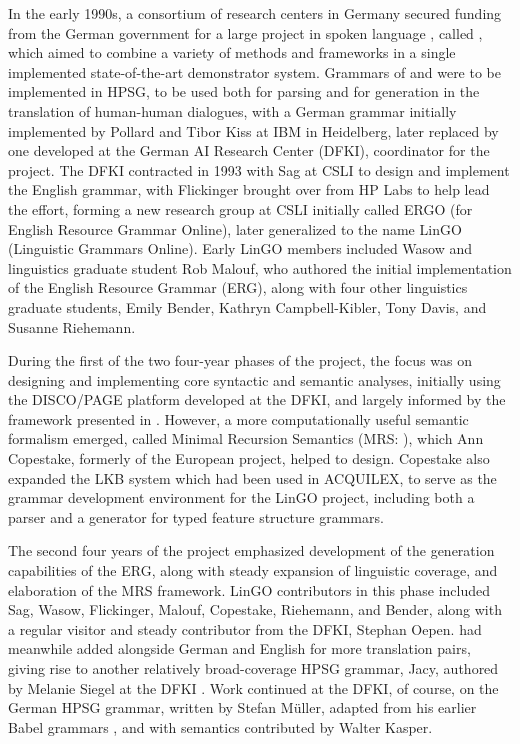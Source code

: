 \documentclass[output=paper
                ,modfonts
                ,nonflat
	        ,collection
	        ,collectionchapter
	        ,collectiontoclongg
 	        ,biblatex
                ,babelshorthands
                ,newtxmath
                ,draftmode
                ,colorlinks, citecolor=brown
]{./langsci/langscibook}
\begin{document}
In the early 1990s, a consortium of research centers in Germany secured funding from the German government for a large project in spoken language , called \verbmobil \citep{Wahlster2000a-ed}, which aimed to combine a variety of methods and frameworks in a single implemented state-of-the-art demonstrator system.  Grammars of  and  were to be implemented in HPSG, to be used both for parsing and for generation in the translation of human-human dialogues, with a German grammar initially implemented by Pollard and Tibor Kiss at IBM in Heidelberg, later replaced by one developed at the German AI Research Center (DFKI), coordinator for the \verbmobil project.  The DFKI contracted in 1993 with Sag at CSLI to design and implement the English grammar, with Flickinger brought over from HP Labs to help lead the effort, forming a new research group at CSLI initially called ERGO (for English Resource Grammar Online), later generalized to the name LinGO (Linguistic Grammars Online).  Early LinGO members included Wasow and linguistics graduate student Rob Malouf, who authored the initial implementation of the English Resource Grammar (ERG), along with four other linguistics graduate students, Emily Bender, Kathryn Campbell-Kibler, Tony Davis, and Susanne Riehemann.

During the first of the two four-year phases of the \verbmobil project, the focus was on designing and implementing core syntactic and semantic analyses, initially using the DISCO/PAGE platform \citep{DISCO94} developed at the DFKI, and largely informed by the framework presented in \citet{ps2}.  However, a more computationally useful semantic formalism emerged, called Minimal Recursion Semantics (MRS: \citealt*{CFPS2005a}), which Ann Copestake, formerly of the European  project, helped to design.  Copestake also expanded the LKB system \citep{Copestake2002a} which had been used in ACQUILEX, to serve as the grammar development environment for the LinGO project, including both a parser and a generator for typed feature structure grammars.

The second four years of the \verbmobil project emphasized development of the generation capabilities of the ERG, along with steady expansion of linguistic coverage, and elaboration of the MRS framework.  LinGO contributors in this phase included Sag, Wasow, Flickinger, Malouf, Copestake, Riehemann, and Bender, along with a regular visitor and steady contributor from the DFKI, Stephan Oepen.  \verbmobil had meanwhile added  alongside German \citep{MK2000a} and English \citep*{FCS2000a} for more translation pairs, giving rise to another relatively broad-coverage HPSG grammar, Jacy, authored by Melanie Siegel at the DFKI \citep{Siegel2000a}.  Work continued at the DFKI, of course, on the German HPSG grammar, written by Stefan M{\"u}ller, adapted from his earlier Babel grammars \citep{Mueller99a}, and with semantics contributed by Walter Kasper.
\end{document}
